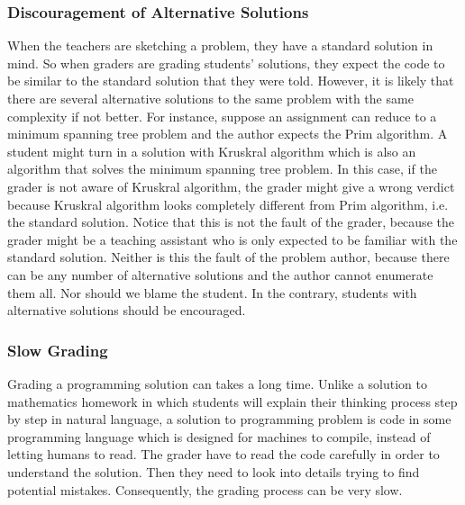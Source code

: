         \subsubsection{Discouragement of Alternative Solutions}

            When the teachers are sketching a problem, they have a standard solution in mind.
            So when graders are grading students' solutions, they expect the code to be similar to
            the standard solution that they were told.
            However, it is likely that there are several alternative solutions to the same problem
            with the same complexity if not better.
            For instance, suppose an assignment can reduce to a minimum spanning tree problem
            and the author expects the Prim algorithm. \cite{cheriton1976finding}
            A student might turn in a solution with Kruskral algorithm which is also an algorithm that
            solves the minimum spanning tree problem. \cite{kruskal1956shortest}
            In this case, if the grader is not aware of Kruskral algorithm, the grader might give a wrong verdict
            because Kruskral algorithm looks completely different from Prim algorithm, i.e. the standard solution.
            Notice that this is not the fault of the grader, because the grader might be a teaching assistant
            who is only expected to be familiar with the standard solution.
            Neither is this the fault of the problem author, because there can be any number of alternative solutions
            and the author cannot enumerate them all.
            Nor should we blame the student.
            In the contrary, students with alternative solutions should be encouraged.

        \subsubsection{Slow Grading}

            Grading a programming solution can takes a long time.
            Unlike a solution to mathematics homework in which students will explain their thinking process
            step by step in natural language,
            a solution to programming problem is code in some programming language which is designed
            for machines to compile, instead of letting humans to read.
            The grader have to read the code carefully in order to understand the solution.
            Then they need to look into details trying to find potential mistakes.
            Consequently, the grading process can be very slow.

